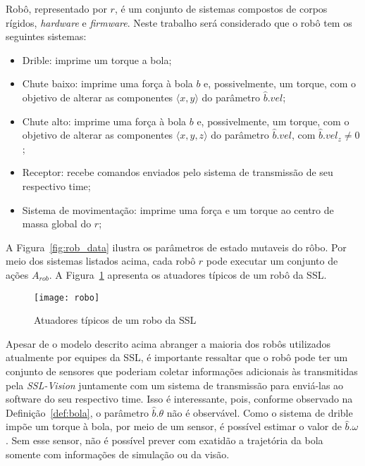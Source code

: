 
\begin{defi}[Robô]
  Robô, representado por $r$, é um conjunto de sistemas compostos
  de corpos rígidos, \textit{hardware} e \textit{firmware}. Neste
  trabalho será considerado que o robô tem os seguintes sistemas:

  \begin{itemize}
    \item Drible: imprime um torque a bola;
    \item Chute baixo: imprime uma força à bola $b$
          e, possivelmente, um torque, com o objetivo de
          alterar as componentes $\langle x,y \rangle$
          do parâmetro $\hat{b}.vel$;
    \item Chute alto: imprime uma força à bola $b$
          e, possivelmente, um torque, com o objetivo de
          alterar as componentes $\langle x,y,z \rangle$
          do parâmetro $\hat{b}.vel$, com $\hat{b}.vel_z \neq 0$;
    \item Receptor: recebe comandos enviados pelo sistema de
          transmissão de seu respectivo time;
    \item Sistema de movimentação: imprime uma força e um torque
          ao centro de massa global do $r$;
  \end{itemize}
\end{defi}

  A Figura~\ref{fig:rob_data} ilustra os parâmetros de estado mutaveis
  do rôbo. Por meio dos sistemas listados acima, cada robô $r$ pode
  executar um conjunto de ações $A_{rob}$. A Figura~\ref{fig:robo}
  apresenta os atuadores típicos de um robô da SSL.

  \begin{figure}[H]
    \centering
    \texttt{[image: robo]}
    \caption{Atuadores típicos de um robo da SSL}\label{fig:robo}
  \end{figure}

  Apesar de o modelo descrito acima abranger a maioria dos
  robôs utilizados atualmente por equipes da SSL, é importante
  ressaltar que o robô pode ter um conjunto de sensores que
  poderiam coletar informações adicionais às transmitidas pela
  \textit{SSL-Vision} juntamente com um sistema de transmissão
  para enviá-las ao software do seu respectivo time. Isso é
  interessante, pois, conforme observado na Definição~\ref{def:bola},
  o parâmetro $\hat{b}.\theta$ não é observável. Como o sistema de
  drible impõe um torque à bola, por meio de um sensor, é possível
  estimar o valor de $\hat{b}.\omega$. Sem esse sensor, não é possível
  prever com exatidão a trajetória da bola somente com informações de
  simulação ou da visão.


